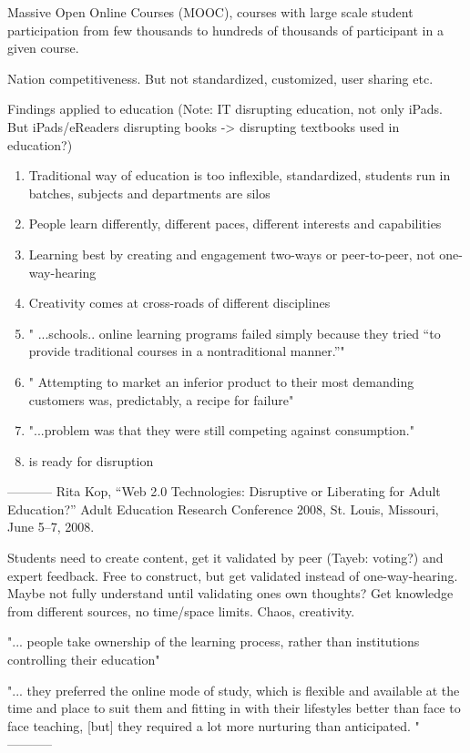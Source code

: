 \documentclass[a4paper,10pt]{article}
\begin{document}
Massive Open Online Courses (MOOC), courses with large scale student participation from few thousands to hundreds of thousands of participant 
in a given course.


Nation competitiveness. But not standardized, customized, user sharing etc.



Findings applied to education 
(Note: IT disrupting education, not only iPads. But iPads/eReaders disrupting books -> disrupting textbooks used in education?)
\begin{enumerate}
 \item Traditional way of education is too inflexible, standardized, students run in batches, subjects and departments are silos
 \item People learn differently, different paces, different interests and capabilities 
 \item Learning best by creating and engagement two-ways or peer-to-peer, not one-way-hearing \cite{disruptiveOrLiberatingEducation}
 \item Creativity comes at cross-roads of different disciplines 
 \item " ...schools.. online learning programs failed simply because they tried “to provide traditional courses in a nontraditional manner.”"
 \item " Attempting to market an inferior product to their most demanding customers was, predictably, a recipe for failure"
 \item "...problem was that they were still competing against consumption."
 \item is ready for disruption
\end{enumerate}


-----------
Rita Kop, “Web 2.0 Technologies: Disruptive or Liberating for Adult Education?” Adult Education Research Conference 2008, St. Louis, Missouri, June 5–7, 2008.
  
Students need to create content, get it validated by peer (Tayeb: voting?) and expert feedback.
Free to construct, but get validated instead of one-way-hearing. Maybe not fully understand until validating ones own thoughts?
Get knowledge from different sources, no time/space limits. Chaos, creativity.

"... people take ownership of the learning process, rather than institutions controlling their education"

"... they preferred the online
mode of study, which is flexible and available at the time and place to suit them and fitting in
with their lifestyles better than face to face teaching, [but] they required a lot more nurturing than
anticipated. "
-----------
\end{document}
